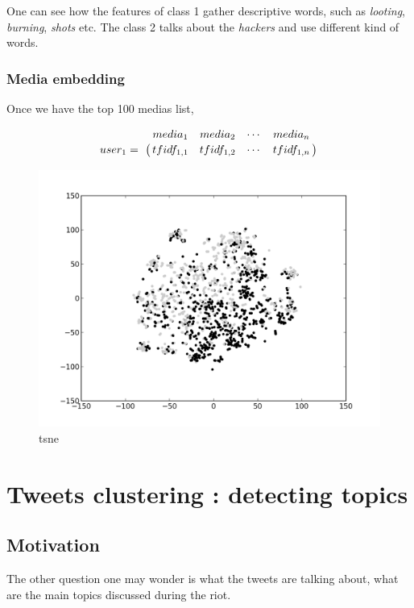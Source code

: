 \documentclass[a4paper,12pt]{report}
\begin{document}
One can see how the features of class 1 gather descriptive words, such as \emph{looting}, \emph{burning}, \emph{shots} etc. The class 2 talks about the \emph{hackers} and use different kind of words.

\newpage
\subsection{Media embedding}
Once we have the top 100 medias list, 

\[
\bordermatrix{~ & media_1 & media_2 & \cdots & media_n \cr user_1 =  & tfidf_{1,1} & tfidf_{1,2} & \cdots & tfidf_{1,n} \cr}
\]

\begin{figure}[H]
\centering
\includegraphics[width=\textwidth]{images/plots/media_tsne.png}
\caption{tsne}
\end{figure}


\chapter{Tweets clustering : detecting topics}

\section{Motivation}
The other question one may wonder is what the tweets are talking about, what are the main topics discussed during the riot. \\
\end{document}
